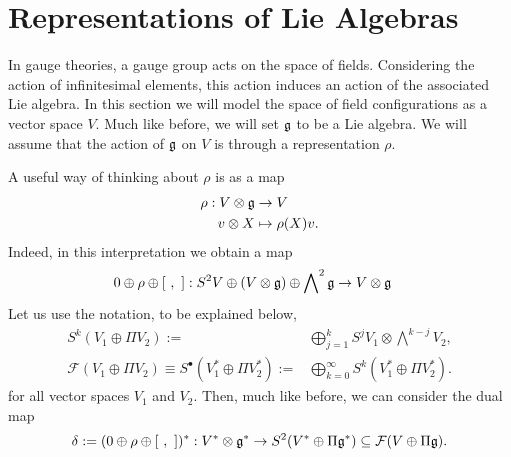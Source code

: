 \section{Representations of Lie Algebras}

In gauge theories, a gauge group acts on the space of fields. Considering the action of infinitesimal elements, this action induces an action of the associated Lie algebra. In this section we will model the space of field configurations as a vector space $V$. Much like before, we will set $\mathfrak{g}$ to be a Lie algebra. We will assume that the action of $\mathfrak{g}$ on $V$ is through a representation $\rho$.

A useful way of thinking about $\rho$ is as a map
\begin{equation}
\begin{aligned}
\rho:V\otimes\mathfrak{g}&\rightarrow V\\
v\otimes X&\mapsto \rho(X)v.
\end{aligned}
\end{equation}
Indeed, in this interpretation we obtain a map
\begin{equation}
\begin{aligned}
0\oplus\rho\oplus\left[~,~\right]:S^2V\oplus(V\otimes\mathfrak{g})\oplus\bigwedge\nolimits^2\mathfrak{g}&\rightarrow V\otimes\mathfrak{g}
\end{aligned}
\end{equation}
Let us use the notation, to be explained below,
\begin{equation}
\begin{aligned}
S^k(V_1\oplus\Pi V_2):=&\bigoplus_{j=1}^k S^jV_1\otimes \bigwedge\nolimits^{k-j}V_2,\\
\mathcal{F}(V_1\oplus\Pi V_2)\equiv S^\bullet(V_1^*\oplus\Pi V_2^*):=&\bigoplus_{k=0}^\infty S^k(V_1^*\oplus\Pi V_2^*).
\end{aligned}
\end{equation} 
for all vector spaces $V_1$ and $V_2$. Then, much like before, we can consider the dual map
\begin{equation}
\delta:=(0\oplus\rho\oplus\left[~,~\right])^*:V^*\otimes\mathfrak{g}^*\rightarrow S^2(V^*\oplus\Pi\mathfrak{g}^*)\subseteq\mathcal{F}(V\oplus\Pi \mathfrak{g}).
\end{equation}

